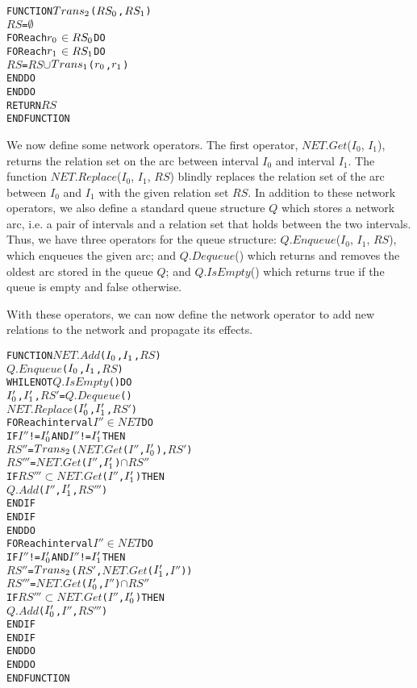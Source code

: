 \documentclass[11pt]{report}
\newenvironment{vverbatim}
{
  \begin{alltt}
}
{
  \vspace{-\baselineskip}
  \end{alltt}
}
\begin{document}
          \begin{vverbatim}
  FUNCTION \(Trans\sb{2}\)(\(RS\sb{0}\), \(RS\sb{1}\))
    \(RS\) = \(\emptyset\)
    FOR each \(r\sb{0}\) \(\in\) \(RS\sb{0}\) DO
      FOR each \(r\sb{1}\) \(\in\) \(RS\sb{1}\) DO
        \(RS\) = \(RS\) \(\cup\) \(Trans\sb{1}\)(\(r\sb{0}\), \(r\sb{1}\))
      ENDDO
    ENDDO
    RETURN \(RS\)
  ENDFUNCTION
          \end{vverbatim}

          We now define some network operators. The first operator,
          $NET.Get$($I_0$, $I_1$), returns the relation set on the arc between
          interval $I_0$ and interval $I_1$. The function $NET.Replace$($I_0$, $I_1$,
          $RS$) blindly replaces the relation set of the arc between $I_0$ and $I_1$
          with the given relation set $RS$. In addition to these network operators,
          we also define a standard queue structure $Q$ which stores a network arc,
          i.e. a pair of intervals and a relation set that holds between the two
          intervals. Thus, we have three operators for the queue structure:
          $Q.Enqueue$($I_0$, $I_1$, $RS$), which enqueues the given arc; and
          $Q.Dequeue$() which returns and removes the oldest arc stored in the queue
          $Q$; and $Q.IsEmpty$() which returns true if the queue is empty and false
          otherwise.

          With these operators, we can now define the network operator to add new
          relations to the network and propagate its effects.

          \begin{vverbatim}
  FUNCTION \(NET.Add\)(\(I\sb{0}\), \(I\sb{1}\), \(RS\))
    \(Q.Enqueue\)(\(I\sb{0}\), \(I\sb{1}\), \(RS\))
    WHILE NOT \(Q.IsEmpty\)() DO
      \(I\sb{0}'\), \(I\sb{1}'\), \(RS'\) = \(Q.Dequeue\)()
      \(NET.Replace\)(\(I\sb{0}'\), \(I\sb{1}'\), \(RS'\))
      FOR each interval \(I''\) \(\in\) \(NET\) DO
        IF \(I''\) != \(I\sb{0}'\) AND \(I''\) != \(I\sb{1}'\) THEN
          \(RS''\) =  \(Trans\sb{2}\)(\(NET.Get\)(\(I''\), \(I\sb{0}'\)), \(RS'\))
          \(RS'''\) = \(NET.Get\)(\(I''\), \(I\sb{1}'\)) \(\cap\) \(RS''\)
          IF \(RS'''\) \(\subset\) \(NET.Get\)(\(I''\), \(I\sb{1}'\)) THEN
            \(Q.Add\)(\(I''\), \(I\sb{1}'\), \(RS'''\))
          ENDIF
        ENDIF
      ENDDO
      FOR each interval \(I''\) \(\in\) \(NET\) DO
        IF \(I''\) != \(I\sb{0}'\) AND \(I''\) != \(I\sb{1}'\) THEN
          \(RS''\) =  \(Trans\sb{2}\)(\(RS'\), \(NET.Get\)(\(I\sb{1}'\), \(I''\)))
          \(RS'''\) = \(NET.Get\)(\(I\sb{0}'\), \(I''\)) \(\cap\) \(RS''\)
          IF \(RS'''\) \(\subset\) \(NET.Get\)(\(I''\), \(I\sb{0}'\)) THEN
            \(Q.Add\)(\(I\sb{0}'\), \(I''\), \(RS'''\))
          ENDIF
        ENDIF
      ENDDO
    ENDDO
  ENDFUNCTION
          \end{vverbatim}
\end{document}
